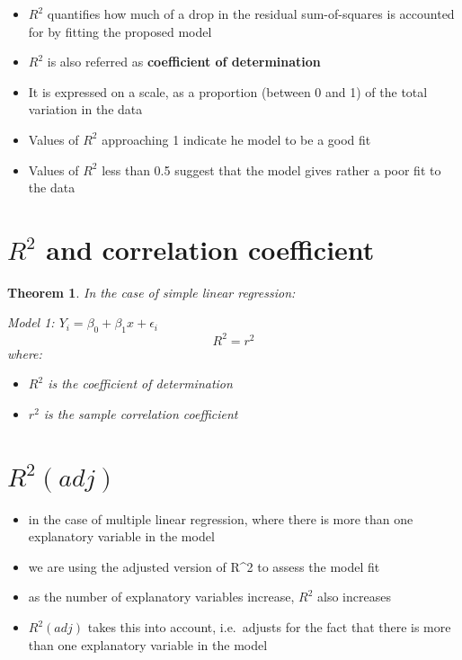 \documentclass[
]{book}
\providecommand{\tightlist}{%
  \setlength{\itemsep}{0pt}\setlength{\parskip}{0pt}}
\newtheorem{theorem}{Theorem}[chapter]
\theoremstyle{definition}
\theoremstyle{definition}
\theoremstyle{definition}
\theoremstyle{remark}
\begin{document}
\begin{itemize}
\tightlist
\item
  \(R^2\) quantifies how much of a drop in the residual sum-of-squares is accounted for by fitting the proposed model
\item
  \(R^2\) is also referred as \textbf{coefficient of determination}
\item
  It is expressed on a scale, as a proportion (between 0 and 1) of the total variation in the data
\item
  Values of \(R^2\) approaching 1 indicate he model to be a good fit
\item
  Values of \(R^2\) less than 0.5 suggest that the model gives rather a poor fit to the data
\end{itemize}

\hypertarget{r2-and-correlation-coefficient}{%
\section{\texorpdfstring{\(R^2\) and correlation coefficient}{R\^{}2 and correlation coefficient}}\label{r2-and-correlation-coefficient}}

\begin{theorem}
\protect\hypertarget{thm:unnamed-chunk-5}{}{\label{thm:unnamed-chunk-5} }
In the case of simple linear regression:

Model 1: \(Y_i = \beta_0 + \beta_1x + \epsilon_i\)
\[R^2 = r^2\]
where:

\begin{itemize}
\tightlist
\item
  \(R^2\) is the coefficient of determination
\item
  \(r^2\) is the sample correlation coefficient
\end{itemize}
\end{theorem}

\hypertarget{r2adj}{%
\section{\texorpdfstring{\(R^2(adj)\)}{R\^{}2(adj)}}\label{r2adj}}

\begin{itemize}
\tightlist
\item
  in the case of multiple linear regression, where there is more than one explanatory variable in the model
\item
  we are using the adjusted version of R\^{}2 to assess the model fit
\item
  as the number of explanatory variables increase, \(R^2\) also increases
\item
  \(R^2(adj)\) takes this into account, i.e.~adjusts for the fact that there is more than one explanatory variable in the model
\end{itemize}
\end{document}
